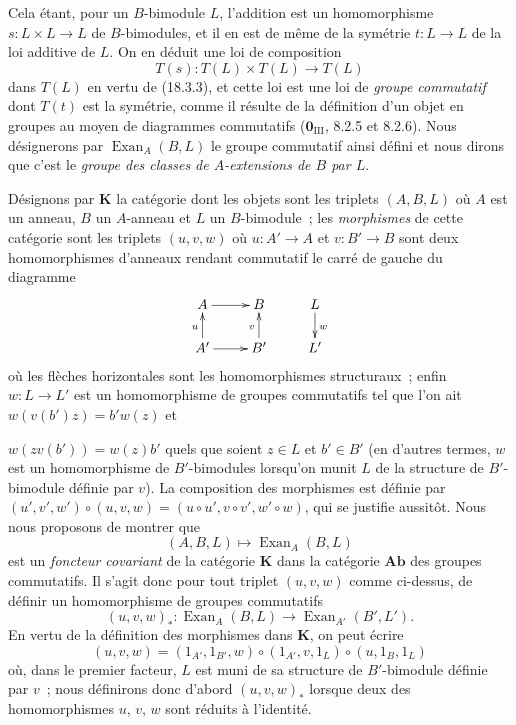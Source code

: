 \begin{env}[18.3.4]
\label{0.18.3.4-fr}
Cela étant, pour un $B$-bimodule $L$, l'addition est un homomorphisme
$s:L\times L\to L$ de $B$-bimodules, et il en est de même de la symétrie
$t:L\to L$ de la loi additive de $L$. On en déduit une loi de composition
\[
  T(s):T(L)\times T(L)\longrightarrow T(L)
\]
dans $T(L)$ en vertu de (18.3.3), et cette loi est une loi de \emph{groupe
commutatif} dont $T(t)$ est la symétrie, comme il résulte de la définition d'un
objet en groupes au moyen de diagrammes commutatifs
($\mathbf 0_{\mathrm{III}}$, 8.2.5 et 8.2.6). Nous désignerons par
$\operatorname{Exan}_A(B,L)$ le groupe commutatif ainsi défini et nous dirons
que c'est le \emph{groupe des classes de $A$-extensions de $B$ par $L$}.
\end{env}

\begin{env}[18.3.5]
\label{0.18.3.5-fr}
Désignons par $\mathbf K$ la catégorie dont les objets sont les triplets
$(A,B,L)$ où $A$ est un anneau, $B$ un $A$-anneau et $L$ un $B$-bimodule~;
les \emph{morphismes} de cette catégorie sont les triplets $(u,v,w)$ où
$u:A'\to A$ et $v:B'\to B$ sont deux homomorphismes d'anneaux rendant
commutatif le carré de gauche du diagramme
\[
  \xymatrix@C=2pc@R=1.5pc{
    A\ar[r] & B & L\ar[d]^w\\
    A'\ar[u]^u\ar[r] & B'\ar[u]^v & L'
  }
\]
où les flèches horizontales sont les homomorphismes structuraux~; enfin
$w:L\to L'$ est un homomorphisme de groupes commutatifs tel que l'on ait
$w(v(b')z)=b'w(z)$ et


$w(zv(b'))=w(z)b'$ quels que soient $z\in L$ et $b'\in B'$ (en d'autres
termes, $w$ est un homomorphisme de $B'$-bimodules lorsqu'on munit $L$ de la
structure de $B'$-bimodule définie par $v$). La composition des morphismes est
définie par
$(u',v',w')\circ(u,v,w)=(u\circ u',v\circ v',w'\circ w)$, qui se justifie
aussitôt. Nous nous proposons de montrer que
\begin{equation}
\label{0.18.3.5.1-fr}
\tag{18.3.5.1}
  (A,B,L)\longmapsto\operatorname{Exan}_A(B,L)
\end{equation}
est un \emph{foncteur covariant} de la catégorie $\mathbf K$ dans la catégorie
$\mathbf{Ab}$ des groupes commutatifs. Il s'agit donc pour tout triplet
$(u,v,w)$ comme ci-dessus, de définir un homomorphisme de groupes commutatifs
\[
  (u,v,w)_*:\operatorname{Exan}_A(B,L)
  \longrightarrow\operatorname{Exan}_{A'}(B',L').
\]
En vertu de la définition des morphismes dans $\mathbf K$, on peut écrire
\[
  (u,v,w)=(1_{A'},1_{B'},w)\circ(1_{A'},v,1_L)
  \circ(u,1_B,1_L)
\]
où, dans le premier facteur, $L$ est muni de sa structure de $B'$-bimodule
définie par $v$~; nous définirons donc d'abord $(u,v,w)_*$ lorsque deux des
homomorphismes $u$, $v$, $w$ sont réduits à l'identité.
\end{env}

